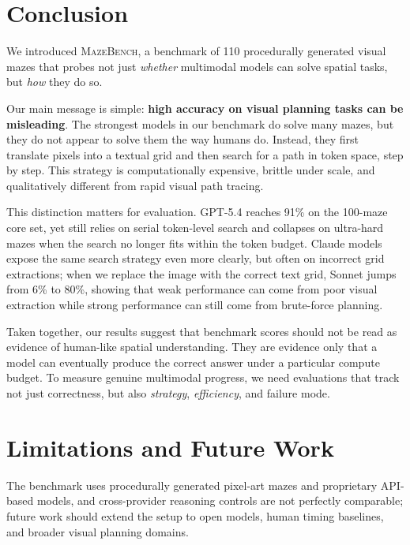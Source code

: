 \documentclass[11pt]{article}
\begin{document}

\section{Conclusion}
\label{sec:conclusion}

We introduced \textsc{MazeBench}, a benchmark of 110 procedurally generated visual mazes that probes not just \emph{whether} multimodal models can solve spatial tasks, but \emph{how} they do so.

Our main message is simple: \textbf{high accuracy on visual planning tasks can be misleading}.
The strongest models in our benchmark do solve many mazes, but they do not appear to solve them the way humans do.
Instead, they first translate pixels into a textual grid and then search for a path in token space, step by step.
This strategy is computationally expensive, brittle under scale, and qualitatively different from rapid visual path tracing.

This distinction matters for evaluation.
GPT-5.4 reaches 91\% on the 100-maze core set, yet still relies on serial token-level search and collapses on ultra-hard mazes when the search no longer fits within the token budget.
Claude models expose the same search strategy even more clearly, but often on incorrect grid extractions; when we replace the image with the correct text grid, Sonnet jumps from 6\% to 80\%, showing that weak performance can come from poor visual extraction while strong performance can still come from brute-force planning.

Taken together, our results suggest that benchmark scores should not be read as evidence of human-like spatial understanding.
They are evidence only that a model can eventually produce the correct answer under a particular compute budget.
To measure genuine multimodal progress, we need evaluations that track not just correctness, but also \emph{strategy}, \emph{efficiency}, and failure mode.

\section*{Limitations and Future Work}

The benchmark uses procedurally generated pixel-art mazes and proprietary API-based models, and cross-provider reasoning controls are not perfectly comparable; future work should extend the setup to open models, human timing baselines, and broader visual planning domains.
\end{document}
